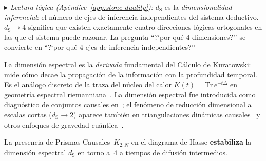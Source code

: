 \documentclass[11pt, a4paper, openany]{book}
\newcommand{\dS}{d_{\mathrm{S}}}
\newcommand{\stoneref}[1]{%
  \smallskip\noindent
  {\small\color{structure!70}\textit{$\blacktriangleright$ Lectura
  l\'ogica (Ap\'endice~\ref{app:stone-duality}):} #1}%
  \smallskip}
\begin{document}
\stoneref{$\dS$ es la \emph{dimensionalidad inferencial}: el n\'umero
de ejes de inferencia independientes del sistema deductivo.
$\dS \to 4$ significa que existen exactamente cuatro direcciones
l\'ogicas ortogonales en las que el sistema puede razonar. La
pregunta ``?`por qu\'e 4 dimensiones?'' se convierte en ``?`por qu\'e
4 ejes de inferencia independientes?''}

\noindent
La dimensi\'on espectral es la \emph{derivada} fundamental del
C\'alculo de Kuratowski: mide c\'omo decae la propagaci\'on de la
informaci\'on con la profundidad temporal. Es el an\'alogo discreto
de la traza del n\'ucleo del calor
$K(t) = \mathrm{Tr}\,e^{-t\Delta}$ en geometr\'ia espectral
riemanniana~\cite{minakshisundaram1949,gilkey1975}. La
dimensi\'on espectral fue introducida como diagn\'ostico de
conjuntos causales en~\cite{eichhorn2014}; el fen\'omeno de
reducci\'on dimensional a escalas cortas ($\dS \to 2$) aparece
tambi\'en en triangulaciones din\'amicas
causales~\cite{ambjorn2005} y otros enfoques de gravedad
cu\'antica~\cite{carlip2009,modesto2009}.

\begin{theorem}
\label{thm:dimensional-stabilization}
La presencia de Prismas Causales~$K_{2,N}$ en el diagrama de Hasse
\textbf{estabiliza} la dimensi\'on espectral $\dS$ en torno a~$4$
a tiempos de difusi\'on intermedios.
\end{theorem}
\end{document}
